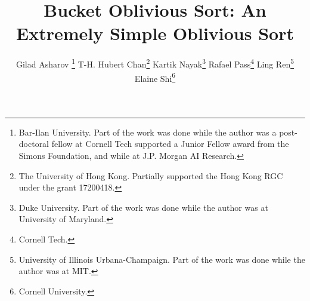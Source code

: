 \documentclass[twoside,leqno,twocolumn]{article}
\begin{document}
\title{Bucket Oblivious Sort: An Extremely Simple Oblivious Sort}

\author{Gilad Asharov \thanks{Bar-Ilan University. Part of the work was done while the author was a post-doctoral fellow at Cornell Tech supported a Junior Fellow award from the Simons Foundation, and while at J.P. Morgan AI Research.} \quad
T-H. Hubert Chan\thanks{The University of Hong Kong. Partially supported the Hong Kong RGC under the grant 17200418.} \quad
Kartik Nayak\thanks{Duke University. Part of the work was done while the author was at University of Maryland.} \quad
Rafael Pass\thanks{Cornell Tech.} \quad
Ling Ren\thanks{University of Illinois Urbana-Champaign. Part of the work was done while the author was at MIT.} \quad
Elaine Shi\thanks{Cornell University.}}

\newcommand{\rl}[1]{{\footnotesize\color{orange}[Ling: #1]}}

\date{}

\maketitle


\begin{abstract}

\end{abstract}









\appendix



\end{document}
